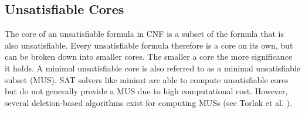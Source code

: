 
\subsection{Unsatisfiable Cores}
The core of an unsatisfiable formula in CNF is a subset of the formula that is also unsatisfiable. Every unsatisfiable formula therefore is a core on its own, but can be broken down into smaller cores. The smaller a core the more significance it holds. A minimal unsatisfiable core is also referred to as a minimal unsatisfiable subset (MUS). SAT solvers like minisat \cite{een2003extensible} are able to compute unsatisfiable cores but do not generally provide a MUS due to high computational cost. However, several deletion-based algorithms exist for computing MUSs (see Torlak et al. \cite{10.1007/978-3-540-68237-0_23}).
